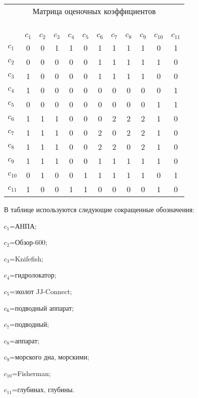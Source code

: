 \begin{multicols}{2}
{\small %
     \begin{center}
     {\tabcolsep=4pt
     \begin{tabular}{|l|c|c|c|c|c|c|c|c|c|c|c|}
\multicolumn{12}{c}{Матрица оценочных коэффициентов}\\
\multicolumn{12}{c}{\ }\\[-4pt]
     \hline
     &$c_1$ & $c_2$ & $c_3$ & $c_4$ &  $c_5$ & $c_6$ & $c_7$ & $c_8$ & $c_9$ &
$c_{10}$ & $c_{11}$\\
     \hline
     $c_1$ & 0&0&1&1&0&1&1&1&1&0&1\\
     $c_2$ & 0&0&0&0&0&1&1&1&1&1&0\\
     $c_3$ & 1&0&0&0&0&1&1&1&1&0&0\\
     $c_4$ & 1&0&0&0&0&0&0&0&0&0&1\\
     $c_5$ & 0&0&0&0&0&0&0&0&0&1&1\\
     $c_6$ & 1&1&1&0&0&0&2&2&2&1&0\\
     $c_7$ & 1&1&1&0&0&2&0&2&2&1&0\\
     $c_8$ & 1&1&1&0&0&2&2&0&2&1&0\\
     $c_9$ & 1&1&1&0&0&1&1&1&1&1&0\\
     $c_{10}$& 0&1&0&0&1&1&1&1&1&0&1\\
     $c_{11}$& 1&0&0&1&1&0&0&0&0&1&0\\
     \hline
     \end{tabular}}
     \end{center}}

\vspace*{12pt}


     В таблице используются следующие сокращенные обозначения:

     $c_1$\;=\;АНПА;

     $c_2$\;=\;Обзор-600;

     $c_3$\;=\;Knifefish;

     $c_4$\;=\;гидролокатор;

     $c_5$\;=\;эхолот JJ-Connect;

     $c_6$\;=\;подводный аппарат;

     $c_7$\;=\;подводный;

     $c_8$\;=\;аппарат;

     $c_9$\;=\;морского дна, морскими;

     $c_{10}$\;=\;Fisherman;

     $c_{11}$\;=\;глубинах, глубины.


\end{multicols}
